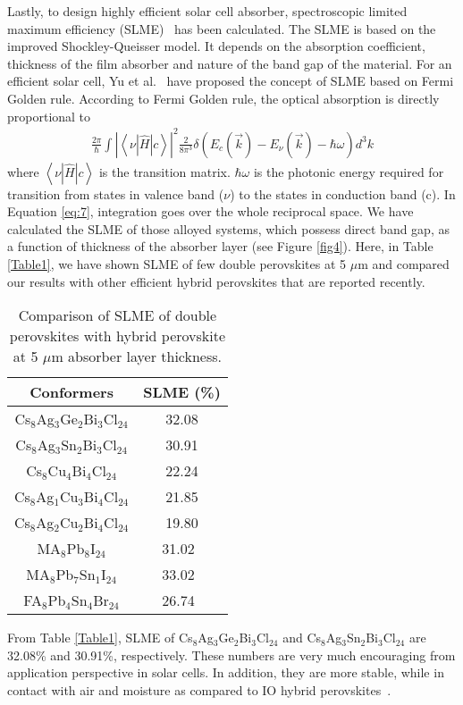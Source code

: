 \documentclass[journal=jpclcd,manuscript=letter]{achemso}
\begin{document}
Lastly, to design highly efficient solar cell absorber, spectroscopic limited maximum efficiency (SLME)~\cite{kangsabanik2018double} has been calculated. The SLME is based on the improved Shockley-Queisser model. It depends on the absorption coefficient, thickness of the film absorber and nature of the band gap of the material. For an efficient solar cell, Yu et al.~\cite{yu2012identification} have proposed the concept of SLME based on Fermi Golden rule. According to Fermi Golden rule, the optical absorption is directly proportional to
\begin{align}
    \frac{2\pi}{\hbar}\int|\left<\nu|\hat{H}|c\right>|^2\frac{2}{8\pi^3}\delta\left(E_c(\overrightarrow{k}) - E_\nu(\overrightarrow{k}) - \hbar\omega\right)d^3k
   \label{eq:7}
\end{align} 
where $\left<\nu|\hat{H}|c\right>$ is the transition matrix. $\hbar\omega$ is the photonic energy required for transition from states in valence band ($\nu$) to the states in conduction band (c). In Equation \ref{eq:7}, integration goes over the whole reciprocal space. 
We have calculated the SLME of those alloyed systems, which possess direct band gap, as a function of thickness of the absorber layer (see Figure \ref{fig4}). Here, in Table \ref{Table1}, we have shown SLME of few double perovskites at 5 $\mu$m and compared our results with other efficient hybrid perovskites that are reported recently.
\begin{table}
	\caption{Comparison of SLME of double perovskites with hybrid perovskite at 5 $\mu$m absorber layer thickness.}
	\begin{center}
		\begin{tabular}{|c|c|} \hline
			Conformers & SLME (\%) \\ \hline
			Cs$_8$Ag$_{3}$Ge$_{2}$Bi$_{3}$Cl$_{24}$ & 32.08  \\ \hline
			Cs$_8$Ag$_{3}$Sn$_{2}$Bi$_{3}$Cl$_{24}$  & 30.91  \\ \hline
			Cs$_8$Cu$_4$Bi$_4$Cl$_{24}$ & 22.24 \\ \hline
			Cs$_8$Ag$_{1}$Cu$_{3}$Bi$_4$Cl$_{24}$ & 21.85 \\ \hline  
			Cs$_8$Ag$_{2}$Cu$_{2}$Bi$_4$Cl$_{24}$ & 19.80 \\ \hline
			MA$_8$Pb$_8$I$_{24}$  &  31.02~\cite{PhysRevB.101.054108}  \\ \hline
			MA$_8$Pb$_7$Sn$_1$I$_{24}$   &  33.02~\cite{PhysRevB.101.054108}  \\ \hline
			FA$_8$Pb$_4$Sn$_4$Br$_{24}$ & 26.74~\cite{kk}\\ \hline 
		\end{tabular}
		\label{Table1}
	\end{center}
	\label{table:1}
\end{table}
From Table \ref{Table1}, SLME of Cs$_8$Ag$_{3}$Ge$_{2}$Bi$_{3}$Cl$_{24}$ and Cs$_8$Ag$_{3}$Sn$_{2}$Bi$_{3}$Cl$_{24}$ are 32.08\% and 30.91\%, respectively. These numbers are very much encouraging from application perspective in solar cells. In addition, they are more stable, while in contact with air and moisture as compared to IO hybrid perovskites~\cite{mcclure2016cs2agbix6,filip2016band}. 
\end{document}
